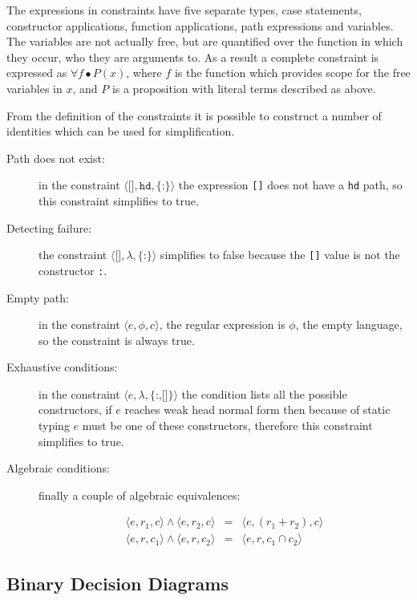 \documentclass[preprint]{sigplanconf}
\newcommand{\T}[1]{\texttt{#1}}
\newcommand{\tup}[1]{\ensuremath{\langle #1 \rangle}}
\renewcommand{\c}[3]{\tup{\T{#1},\T{#2},\T{\{#3\}}}}
\newcommand{\cc}[2]{\c{#1}{$\lambda$}{#2}}
\begin{document}
The expressions in constraints have five separate types, case statements, constructor applications, function applications, path expressions and variables. The variables are not actually free, but are quantified over the function in which they occur, who they are arguments to. As a result a complete constraint is expressed as $\forall f \bullet P(x)$, where $f$ is the function which provides scope for the free variables in $x$, and $P$ is a proposition with literal terms described as above.

From the definition of the constraints it is possible to construct a number of identities which can be used for simplification.

\begin{description}

\item[Path does not exist:] in the constraint \c{[]}{hd}{:} the expression \T{[]} does not have a \T{hd} path, so this constraint simplifies to true.

\item[Detecting failure:] the constraint \cc{[]}{:} simplifies to false because the \T{[]} value is not the constructor \T{:}.

\item[Empty path:] in the constraint $\tup{e,\phi,c}$, the regular expression is $\phi$, the empty language, so the constraint is always true.

\item[Exhaustive conditions:] in the constraint \cc{$e$}{:,[]} the condition lists all the possible constructors, if $e$ reaches weak head normal form then because of static typing $e$ must be one of these constructors, therefore this constraint simplifies to true.

\item[Algebraic conditions:] finally a couple of algebraic equivalences:

\[
\begin{array}{rcl}
\tup{e,r_1,c} \wedge \tup{e,r_2,c} & = & \tup{e,(r_1+r_2),c} \\
\tup{e,r,c_1} \wedge \tup{e,r,c_2} & = & \tup{e,r,c_1 \cap c_2}
\end{array}
\]
\end{description}

\subsection{Binary Decision Diagrams}
\end{document}
